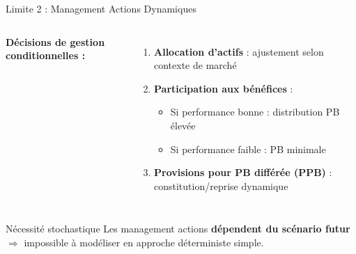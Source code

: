 \documentclass[10pt,aspectratio=169,xcolor={dvipsnames}]{beamer}
\begin{document}
\begin{frame}{Limite 2 : Management Actions Dynamiques}
\begin{columns}
\textbf{Décisions de gestion conditionnelles :}
\begin{enumerate}
    \item \textbf{Allocation d'actifs} : ajustement selon contexte de marché
    \item \textbf{Participation aux bénéfices} :
    \begin{itemize}
        \item Si performance bonne : distribution PB élevée
        \item Si performance faible : PB minimale
    \end{itemize}
    \item \textbf{Provisions pour PB différée (PPB)} : constitution/reprise dynamique
\end{enumerate}

\end{columns}

\vspace{0.3cm}
\begin{exampleblock}{Nécessité stochastique}
Les management actions \textbf{dépendent du scénario futur} $\Rightarrow$ impossible à modéliser en approche déterministe simple.
\end{exampleblock}
\end{frame}
\end{document}
